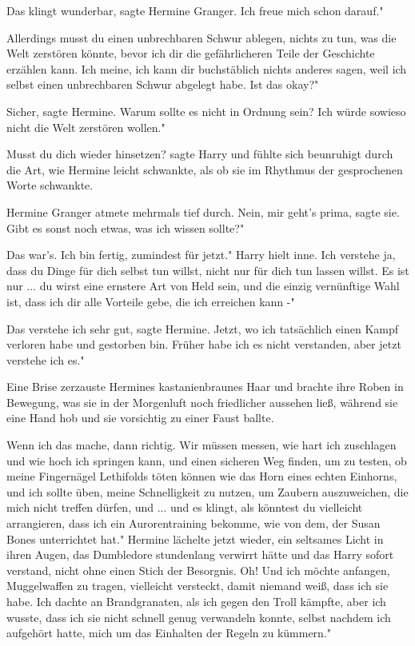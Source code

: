 \glqq Das klingt wunderbar\grqq{}, sagte Hermine Granger. \glqq Ich freue mich
schon darauf."

\glqq Allerdings musst du einen unbrechbaren Schwur ablegen, nichts zu tun, was
die Welt zerstören könnte, bevor ich dir die gefährlicheren Teile der Geschichte
erzählen kann. Ich meine, ich kann dir buchstäblich nichts anderes sagen, weil
ich selbst einen unbrechbaren Schwur abgelegt habe. Ist das okay?"

\glqq Sicher\grqq{}, sagte Hermine. \glqq Warum sollte es nicht in Ordnung sein?
Ich würde sowieso nicht die Welt zerstören wollen."

\glqq Musst du dich wieder hinsetzen?\grqq{} sagte Harry und fühlte sich
beunruhigt durch die Art, wie Hermine leicht schwankte, als ob sie im Rhythmus
der gesprochenen Worte schwankte.

Hermine Granger atmete mehrmals tief durch. \glqq Nein, mir geht's prima\grqq{},
sagte sie. \glqq Gibt es sonst noch etwas, was ich wissen sollte?"

\glqq Das war's. Ich bin fertig, zumindest für jetzt." Harry hielt inne. \glqq
Ich verstehe ja, dass du Dinge für dich selbst tun willst, nicht nur für dich
tun lassen willst. Es ist nur ... du wirst eine ernstere Art von Held sein, und
die einzig vernünftige Wahl ist, dass ich dir alle Vorteile gebe, die ich
erreichen kann -"

\glqq Das verstehe ich sehr gut\grqq{}, sagte Hermine. \glqq Jetzt, wo ich
tatsächlich einen Kampf verloren habe und gestorben bin. Früher habe ich es
nicht verstanden, aber jetzt verstehe ich es."

Eine Brise zerzauste Hermines kastanienbraunes Haar und brachte ihre Roben in
Bewegung, was sie in der Morgenluft noch friedlicher aussehen ließ, während sie
eine Hand hob und sie vorsichtig zu einer Faust ballte.

\glqq Wenn ich das mache, dann richtig. Wir müssen messen, wie hart ich
zuschlagen und wie hoch ich springen kann, und einen sicheren Weg finden, um zu
testen, ob meine Fingernägel Lethifolds töten können wie das Horn eines echten
Einhorns, und ich sollte üben, meine Schnelligkeit zu nutzen, um Zaubern
auszuweichen, die mich nicht treffen dürfen, und ... und es klingt, als könntest
du vielleicht arrangieren, dass ich ein Aurorentraining bekomme, wie von dem,
der Susan Bones unterrichtet hat." Hermine lächelte jetzt wieder, ein seltsames
Licht in ihren Augen, das Dumbledore stundenlang verwirrt hätte und das Harry
sofort verstand, nicht ohne einen Stich der Besorgnis. \glqq Oh! Und ich möchte
anfangen, Muggelwaffen zu tragen, vielleicht versteckt, damit niemand weiß, dass
ich sie habe. Ich dachte an Brandgranaten, als ich gegen den Troll kämpfte, aber
ich wusste, dass ich sie nicht schnell genug verwandeln konnte, selbst nachdem
ich aufgehört hatte, mich um das Einhalten der Regeln zu kümmern."

